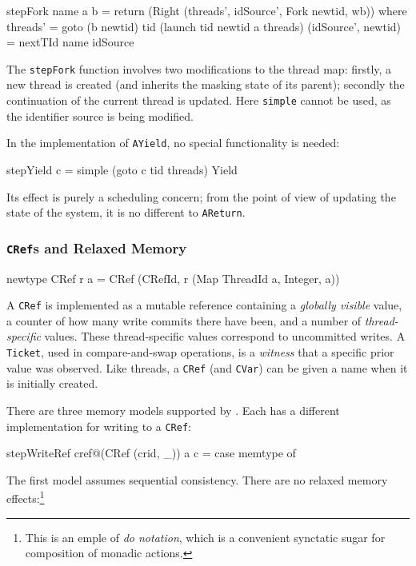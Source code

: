 \begin{haskellcode}
stepFork name a b = return (Right (threads', idSource', Fork newtid, wb)) where
  threads' = goto (b newtid) tid (launch tid newtid a threads)
  (idSource', newtid) = nextTId name idSource
\end{haskellcode}

The \verb|stepFork| function involves two modifications to the thread
map: firstly, a new thread is created (and inherits the masking state
of its parent); secondly the continuation of the current thread is
updated. Here \verb|simple| cannot be used, as the identifier source
is being modified.

In the implementation of \verb|AYield|, no special functionality is
needed:

\begin{haskellcode}
stepYield c = simple (goto c tid threads) Yield
\end{haskellcode}

Its effect is purely a scheduling concern; from the point of view of
updating the state of the system, it is no different to
\verb|AReturn|.

\subsubsection{\texttt{CRef}s and Relaxed Memory}
\label{sec:execution-stepwise-cref}

\begin{haskellcode}
newtype CRef r a = CRef (CRefId, r (Map ThreadId a, Integer, a))
\end{haskellcode}

A \verb|CRef| is implemented as a mutable reference containing a
\emph{globally visible} value, a counter of how many write commits
there have been, and a number of \emph{thread-specific} values. These
thread-specific values correspond to uncommitted writes. A
\verb|Ticket|, used in compare-and-swap operations, is a
\emph{witness} that a specific prior value was observed. Like threads,
a \verb|CRef| (and \verb|CVar|) can be given a name when it is
initially created.

There are three memory models supported by \dejafu{}. Each has a
different implementation for writing to a \verb|CRef|:

\begin{haskellcode}
stepWriteRef cref@(CRef (crid, _)) a c = case memtype of
\end{haskellcode}

The first model assumes sequential consistency. There are no relaxed
memory effects:\footnote{This is an emple of \emph{do notation}, which
  is a convenient synctatic sugar for composition of monadic actions.}

